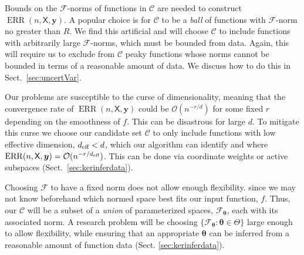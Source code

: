 \documentclass[11pt]{NSFamsart}
\newcommand{\eff}{\textup{eff}}
\DeclareMathOperator{\ERR}{ERR}
\newcommand{\mX}{\mathsf{X}}
\newcommand{\by}{{\boldsymbol{y}}}
\newcommand{\btheta}{{\boldsymbol{\theta}}}
\newcommand{\calc}{{\mathcal{C}}}
\newcommand{\calf}{{\mathcal{F}}}
\newcommand{\Order}{\mathcal{O}}
\begin{document}
Bounds on the $\calf$-norms of functions in  $\calc$ are needed to construct $\ERR(n,\mX,\by)$.  A popular choice is for $\calc$ to be a \emph{ball} of functions with $\calf$-norm no greater than $R$.  We find this artificial and will choose $\calc$ to include functions with arbitrarily large $\calf$-norms, which must be bounded from data.  Again, this will require us to exclude from $\calc$  peaky functions whose norms cannot be bounded in terms of a reasonable amount of data.  We discuss how to do this in Sect.\ \ref{sec:uncertVar}.

Our problems are susceptible to the curse of dimensionality, meaning that the convergence rate of $\ERR(n,\mX,\by)$ could be $\Order(n^{-r/d})$ for some fixed $r$ depending on the smoothness of $f$.  
This can be disastrous for large $d$.  
To mitigate this curse we choose our candidate set $\calc$ to only include functions with low effective dimension, $d_\eff < d$, which our algorithm can identify and where $\ERR(n,\mX,\by) = \Order(n^{-r/d_\eff})$.  This can be done via coordinate weights or active subspaces (Sect.\ \ref{sec:kerinferdata}). 

Choosing  $\calf$ to have a fixed norm does not allow enough flexibility. since we may not know beforehand which normed space best fits our input function, $f$.  Thus, our $\calc$ will  be a subset of a \emph{union} of parameterized spaces, $\calf_\btheta$, each with its associated norm.  A research problem will be choosing $\{\calf_\btheta : \btheta \in \Theta\}$ large enough to allow flexibility, while ensuring that an appropriate $\btheta$ can be inferred from a reasonable amount of function data (Sect. \ref{sec:kerinferdata}).
\end{document}
